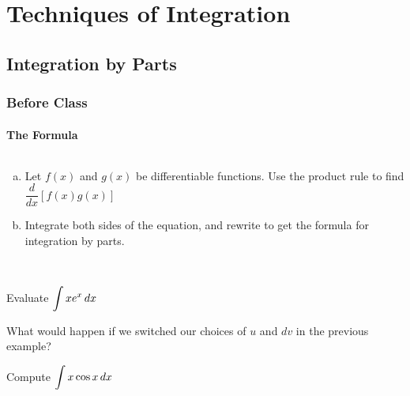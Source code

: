 \documentclass[notes]{subfiles}
\begin{document}
	\chapter{Techniques of Integration}
	\fancyhead[LO,RE]{\bfseries \small \currentname}
	\fancyfoot[C]{{}}
	\fancyfoot[RO,LE]{\large \thepage}	%
	
\section*{Integration by Parts}\label{cs71}
	\subsection*{Before Class}
	\subsubsection*{The Formula}
		\begin{ex}
			$ $
			\begin{enumerate}[(a)]
				\item Let $f(x)$ and $g(x)$ be differentiable functions.  Use the product rule to find $\dfrac{d}{dx}\left[f(x)g(x)\right]$
					
				\item Integrate both sides of the equation, and rewrite to get the formula for integration by parts.
			\end{enumerate}
		\end{ex}
		
		\begin{rmk}
			\\[40pt]
		\end{rmk}
		\newpage
		
		\begin{ex}
			Evaluate $\displaystyle \int xe^x\, dx$
		\end{ex}
			\vs{1}
			
		\begin{question}
			What would happen if we switched our choices of $u$ and $dv$ in the previous example?
		\end{question}
			\vs{.5}
			
		\begin{ex}
			Compute $\displaystyle \int x\cos x\, dx$
		\end{ex}
			\vs{1}
			\newpage
			
\end{document}
